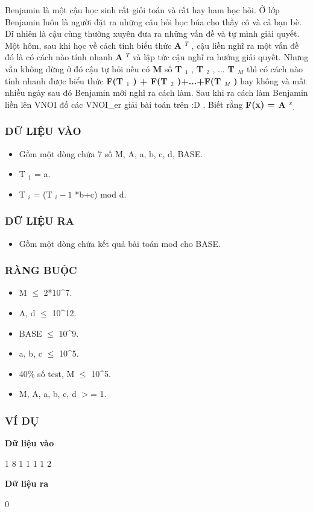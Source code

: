 



   Benjamin là một cậu học sinh rất giỏi toán và rất hay ham học hỏi. Ở lớp Benjamin luôn là người đặt ra những câu hỏi học búa cho thầy cô và cả bạn bè. Dĩ nhiên là cậu cùng thường xuyên đưa ra những vấn đề và tự mình giải quyết. Một hôm, sau khi học về cách tính biểu thức   \textbf{    A    $^     T    $}   , cậu liền nghĩ ra một vấn đề đó là có cách nào tính nhanh   \textbf{    A    $^     T    $}   và lập tức cậu nghĩ ra hướng giải quyết. Nhưng vẫn không dừng ở đó cậu tự hỏi nếu có   \textbf{    M   }   số   \textbf{    T    $_     1    $}   ,   \textbf{    T    $_     2    $}   , ...   \textbf{    T    $_     M    $}   thì có cách nào tính nhanh được biểu thức   \textbf{    F(T    $_     1    $    ) + F(T    $_     2    $    )+...+F(T    $_     M    $    )   }   hay không và mất nhiều ngày sau đó Benjamin mới nghĩ ra cách làm. Sau khi ra cách làm Benjamin liền lên VNOI đố các VNOI\_er giải bài toán trên :D . Biết rằng   \textbf{    F(x) = A    $^     x    $}$_    .   $

\subsubsection{   DỮ LIỆU VÀO  }


\begin{itemize}
	\item     Gồm một dòng chứa 7 số M, A, a, b, c, d, BASE.   
	\item     T    $_     1    $    = a.   
	\item     T    $_     i    $    = (T    $_     i-1    $    *b+c) mod d.   
\end{itemize}



\subsubsection{   DỮ LIỆU RA  }
\begin{itemize}
	\item     Gồm một dòng chứa kết quả bài toán mod cho BASE.   
\end{itemize}

\subsubsection{   RÀNG BUỘC  }


\begin{itemize}
	\item     M  $\le$  2*10^7.   
	\item     A, d  $\le$  10^12.   
	\item     BASE  $\le$  10^9.   
	\item     a, b, c  $\le$  10^5.   
	\item     40\% số test, M  $\le$  10^5.   
	\item     M, A, a, b, c, d $>$= 1.   
\end{itemize}



\subsubsection{   VÍ DỤ  }

\textbf{    Dữ liệu vào   }

   1 8 1 1 1 1 2  

\textbf{    Dữ liệu ra   }

   0  



